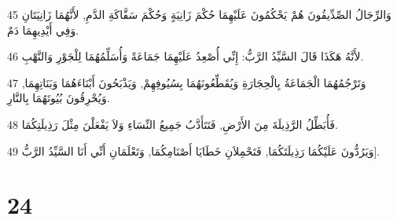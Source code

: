 \par 45 وَالرِّجَالُ الصِّدِّيقُونَ هُمْ يَحْكُمُونَ عَلَيْهِمَا حُكْمَ زَانِيَةٍ وَحُكْمَ سَفَّاكَةِ الدَّمِ, لأَنَّهُمَا زَانِيَتَانِ وَفِي أَيْدِيهِمَا دَمٌ.
\par 46 لأَنَّهُ هَكَذَا قَالَ السَّيِّدُ الرَّبُّ: إِنِّي أُصْعِدُ عَلَيْهِمَا جَمَاعَةً وَأُسَلِّمُهُمَا لِلْجَوْرِ وَالنَّهْبِ.
\par 47 وَتَرْجُمُهُمَا الْجَمَاعَةُ بِالْحِجَارَةِ وَيُقَطِّعُونَهُمَا بِسُيُوفِهِمْ, وَيَذْبَحُونَ أَبْنَاءَهُمَا وَبَنَاتِهِمَا, وَيُحْرِقُونَ بُيُوتَهُمَا بِالنَّارِ.
\par 48 فَأُبَطِّلُ الرَّذِيلَةَ مِنَ الأَرْضِ, فَتَتَأَدَّبُ جَمِيعُ النِّسَاءِ وَلاَ يَفْعَلْنَ مِثْلَ رَذِيلَتِكُمَا.
\par 49 وَيَرُدُّونَ عَلَيْكُمَا رَذِيلَتَكُمَا, فَتَحْمِلاَنِ خَطَايَا أَصْنَامِكُمَا, وَتَعْلَمَانِ أَنِّي أَنَا السَّيِّدُ الرَّبُّ].

\chapter{24}

